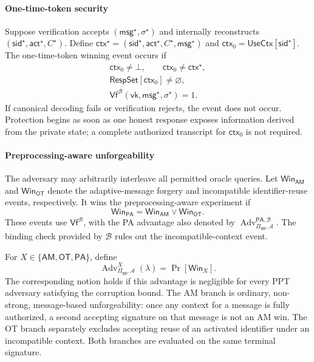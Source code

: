 \documentclass[lettersize,journal]{IEEEtran}
\begin{document}
\paragraph{One-time-token security}
Suppose verification accepts $(\mathsf{msg}^{\star},\sigma^{\star})$ and
internally reconstructs
$(\mathsf{sid}^{\star},\mathsf{act}^{\star},C^{\star})$. Define
$\mathsf{ctx}^{\star}=(\mathsf{sid}^{\star},\mathsf{act}^{\star},
C^{\star},\mathsf{msg}^{\star})$ and
$\mathsf{ctx}_0=\mathsf{UseCtx}[\mathsf{sid}^{\star}]$.
The one-time-token winning event occurs if
\[
\begin{gathered}
\mathsf{ctx}_0\ne\bot,\qquad
\mathsf{ctx}_0\ne\mathsf{ctx}^{\star},\\
\mathsf{RespSet}[\mathsf{ctx}_0]\ne\varnothing,\\
\mathsf{Vf}^{\mathcal B}(\mathsf{vk},\mathsf{msg}^{\star},
\sigma^{\star})=1.
\end{gathered}
\]
If canonical decoding fails or verification rejects, the event does not
occur. Protection begins as soon as one honest response exposes
information derived from the private state; a complete authorized
transcript for $\mathsf{ctx}_0$ is not required.

\paragraph{Preprocessing-aware unforgeability}
The adversary may arbitrarily interleave all permitted oracle queries.
Let $\mathsf{Win}_{\mathsf{AM}}$ and $\mathsf{Win}_{\mathsf{OT}}$ denote
the adaptive-message forgery and incompatible identifier-reuse events,
respectively. It wins the preprocessing-aware experiment if
\[
\mathsf{Win}_{\mathsf{PA}}=
\mathsf{Win}_{\mathsf{AM}}\lor\mathsf{Win}_{\mathsf{OT}}.
\]
These events use $\mathsf{Vf}^{\mathcal B}$, with the PA advantage also
denoted by
$\operatorname{Adv}^{\mathsf{PA},\mathcal B}_{\Pi_{\mathsf{pp}},\mathcal A}$.
The binding check provided by $\mathcal B$ rules out the
incompatible-context event.

For $X\in\{\mathsf{AM},\mathsf{OT},\mathsf{PA}\}$, define
\[
\operatorname{Adv}^{X}_{\Pi_{\mathsf{pp}},\mathcal A}(\lambda)
=\Pr[\mathsf{Win}_X].
\]
The corresponding notion holds if this advantage is negligible for every
PPT adversary satisfying the corruption bound. The AM branch is ordinary,
non-strong, message-based unforgeability: once any context for a message
is fully authorized, a second accepting signature on that message is not
an AM win. The OT branch separately excludes accepting reuse of an
activated identifier under an incompatible context. Both branches are
evaluated on the same terminal signature.
\end{document}
